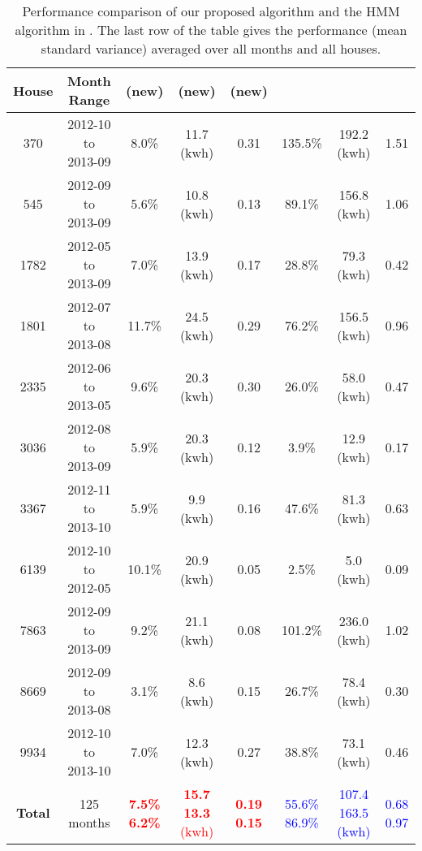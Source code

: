 \documentclass[conference]{IEEEtran}
\begin{document}
\begin{table*}[thp]
\caption{Performance comparison of our proposed algorithm and the HMM algorithm in \cite{parson2012non}. The last row of the table gives the performance (mean  standard variance) averaged over all months and all houses.}
\label{Table1}
\centering
\begin{tabular}{c|c|c|c|c| c|c|c}
\hline\hline
\textbf{House }            &  \textbf{Month Range}  &   (new)    &    (new)        &  (new)    &  \cite{parson2012non}   & \cite{parson2012non}  &   \cite{parson2012non} \\
\hline
370                    & 2012-10 to 2013-09     & 8.0\%       & 11.7 (kwh) & 0.31   &        135.5\%           &192.2 (kwh) &    1.51        \\ \hline
545                   & 2012-09 to 2013-09   &  5.6\%        & 10.8 (kwh) &  0.13     &    89.1\%          & 156.8 (kwh)  &    1.06             \\    \hline
1782                   &   2012-05 to 2013-09    &   7.0\%      & 13.9 (kwh) &  0.17      &     28.8\%          & 79.3 (kwh)  &   0.42           \\ \hline
1801                  &  2012-07 to 2013-08  & 11.7\%         & 24.5 (kwh) &   0.29    &    76.2\%        & 156.5 (kwh) &   0.96            \\ \hline
2335                   & 2012-06 to 2013-05     &  9.6\%     & 20.3 (kwh) & 0.30    &       26.0\%           &58.0 (kwh) &     0.47    \\  \hline
3036                  & 2012-08 to 2013-09    &  5.9\%         & 20.3 (kwh) &  0.12     &     3.9\%         &12.9 (kwh) &   0.17          \\ \hline
3367                  & 2012-11 to 2013-10   &   5.9\%        & 9.9 (kwh) &  0.16     &        47.6\%       &81.3 (kwh) &  0.63              \\  \hline
6139                  & 2012-10 to 2012-05    &  10.1\%       & 20.9 (kwh) &  0.05       &      2.5\%        &5.0 (kwh) &    0.09        \\ \hline
7863                   &  2012-09 to 2013-09    &  9.2\%     & 21.1 (kwh) &    0.08        &    101.2\%       &   236.0 (kwh) & 1.02            \\ \hline
8669                   &   2012-09 to 2013-08    &  3.1\%     & 8.6 (kwh) &   0.15      &    26.7\%           &78.4 (kwh) &  0.30   \\   \hline
9934                   &  2012-10 to 2013-10   &  7.0\%      & 12.3 (kwh) &  0.27       &       38.8\%       & 73.1 (kwh) &  0.46          \\  \hline\hline
\textbf{Total}    &  125 months            &  \textcolor{red}{\textbf{7.5\%  6.2\%}}     &  \textcolor{red}{\textbf{15.7  13.3} (kwh)} &  \textcolor{red}{\textbf{0.19  0.15 }}      &     \textcolor{blue}{55.6\%  86.9\%}       & \textcolor{blue}{107.4   163.5 (kwh)}     &  \textcolor{blue}{ 0.68  0.97}      \\
\hline\hline
\end{tabular}
\end{table*}
\end{document}
